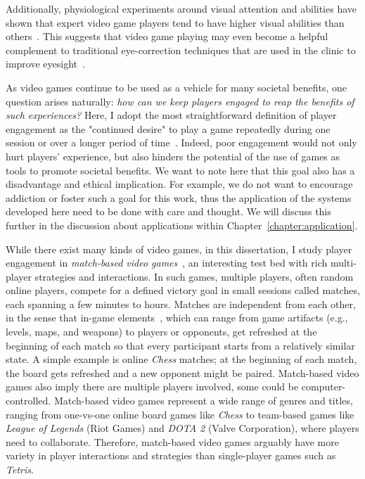 Additionally, physiological experiments around visual attention and abilities have shown that expert video game players tend to have higher visual abilities than others~\citep{green2003action,li2009enhancing}. This suggests that video game playing may even become a helpful complement to traditional eye-correction techniques that are used in the clinic to improve eyesight~\citep{li2009enhancing}.

As video games continue to be used as a vehicle for many societal benefits, one question arises naturally: \textit{how can we keep players engaged to reap the benefits of such experiences?} Here, I adopt the most straightforward definition of player engagement as the "continued desire" to play a game repeatedly during one session or over a longer period of time~\citep{schoenau2011player}. Indeed, poor engagement would not only hurt players' experience, but also hinders the potential of the use of  games as tools to promote societal benefits. We want to note here that this goal also has a disadvantage and ethical implication. For example, we do not want to encourage addiction or foster such a goal for this work, thus the application of the systems developed here need to be done with care and thought. We will discuss this further in the discussion about applications within Chapter~\ref{chapter:application}.  


While there exist many kinds of video games, in this dissertation, I study player engagement in \textit{match-based video games}~\citep{guo2012analysis}, an interesting test bed with rich multi-player strategies and interactions. In such games, multiple players, often random online players, compete for a defined victory goal in small sessions called matches, each spanning a few minutes to hours. Matches are independent from each other, in the sense that in-game elements~\citep{ralph2015toward,fullerton2008game}, which can range from game artifacts (e.g., levels, maps, and weapons) to players or opponents, get refreshed at the beginning of each match so that every participant starts from a relatively similar state. A simple example is online \textit{Chess} matches; at the beginning of each match, the board gets refreshed and a new opponent might be paired. Match-based video games also imply there are multiple players involved, some could be computer-controlled. Match-based video games represent a wide range of genres and titles, ranging from one-vs-one online board games like \textit{Chess} to team-based games like \textit{League of Legends} (Riot Games) and \textit{DOTA 2} (Valve Corporation), where players need to collaborate. Therefore, match-based video games arguably have more variety in player interactions and strategies than single-player games such as \textit{Tetris}. 

